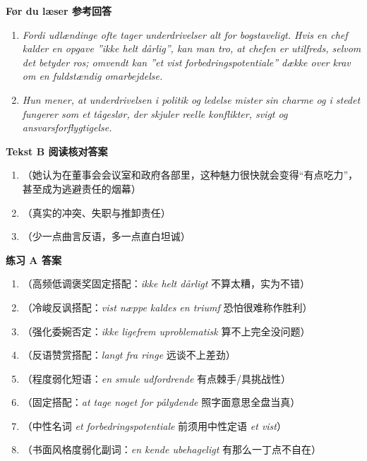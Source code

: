 \begin{answerbox}
\textbf{Før du læser 参考回答}
\begin{enumerate}
  \item \textit{Fordi udlændinge ofte tager underdrivelser alt for bogstaveligt. Hvis en chef kalder en opgave ”ikke helt dårlig”, kan man tro, at chefen er utilfreds, selvom det betyder ros; omvendt kan ”et vist forbedringspotentiale” dække over krav om en fuldstændig omarbejdelse.}
  \item \textit{Hun mener, at underdrivelsen i politik og ledelse mister sin charme og i stedet fungerer som et tågeslør, der skjuler reelle konflikter, svigt og ansvarsforflygtigelse.}
\end{enumerate}

\textbf{Tekst B 阅读核对答案}
\begin{enumerate}
  \item {}（她认为在董事会会议室和政府各部里，这种魅力很快就会变得“有点吃力”，甚至成为逃避责任的烟幕）
  \item {}（真实的冲突、失职与推卸责任）
  \item {}（少一点曲言反语，多一点直白坦诚）
\end{enumerate}

\textbf{练习 A 答案}
\begin{enumerate}
  \item {}（高频低调褒奖固定搭配：\textit{ikke helt dårligt} 不算太糟，实为不错）
  \item {}（冷峻反讽搭配：\textit{vist næppe kaldes en triumf} 恐怕很难称作胜利）
  \item {}（强化委婉否定：\textit{ikke ligefrem uproblematisk} 算不上完全没问题）
  \item {}（反语赞赏搭配：\textit{langt fra ringe} 远谈不上差劲）
  \item {}（程度弱化短语：\textit{en smule udfordrende} 有点棘手/具挑战性）
  \item {}（固定搭配：\textit{at tage noget for pålydende} 照字面意思全盘当真）
  \item {}（中性名词 \textit{et forbedringspotentiale} 前须用中性定语 \textit{et vist}）
  \item {}（书面风格度弱化副词：\textit{en kende ubehageligt} 有那么一丁点不自在）
\end{enumerate}


\end{answerbox}
